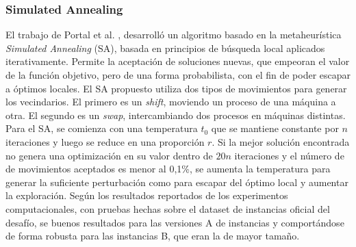 \documentclass[../informe2.tex]{subfiles}
\begin{document}
\subsubsection{Simulated Annealing}

El trabajo de Portal et al. \cite{portal2015sa}, desarrolló un algoritmo basado en la metaheurística \textit{Simulated Annealing} (SA), basada en principios de búsqueda local aplicados iterativamente. Permite la aceptación de soluciones nuevas, que empeoran el valor de la función objetivo, pero de una forma probabilista, con el fin de poder escapar a  óptimos locales. El SA propuesto utiliza dos tipos de movimientos para generar los vecindarios. El primero es un \textit{shift}, moviendo un proceso de una máquina a otra. El segundo es un \textit{swap}, intercambiando dos procesos en máquinas distintas. Para el SA, se comienza con una temperatura $t_0$ que se mantiene constante por $n$ iteraciones y luego se reduce en una proporción $r$. Si la mejor solución encontrada no genera una optimización en su valor dentro de $20n$ iteraciones y el número de de movimientos aceptados es menor al 0,1\%, se aumenta la temperatura para generar la suficiente perturbación como para escapar del óptimo local y aumentar la exploración. Según los resultados reportados de los experimentos computacionales, con pruebas hechas sobre el dataset de instancias oficial del desafío, se buenos resultados  para las versiones A de instancias y comportándose de forma robusta para las instancias B, que eran la de mayor tamaño.
\end{document}
